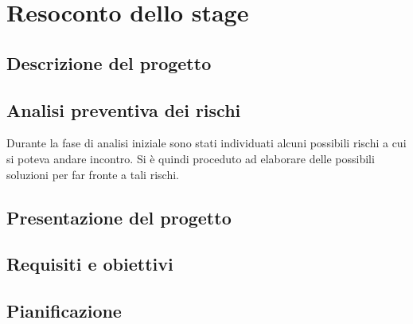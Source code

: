
\chapter{Resoconto dello stage}
\label{cap:resoconto-stage}

\section{Descrizione del progetto}

\section{Analisi preventiva dei rischi}

Durante la fase di analisi iniziale sono stati individuati alcuni possibili rischi a cui si poteva andare incontro.
Si è quindi proceduto ad elaborare delle possibili soluzioni per far fronte a tali rischi.\\

\section{Presentazione del progetto}


\section{Requisiti e obiettivi}


\section{Pianificazione}